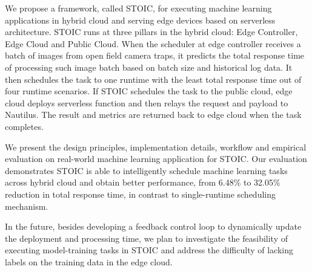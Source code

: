 We propose a framework, called STOIC, for executing machine learning applications in hybrid cloud and serving edge devices based on serverless architecture. STOIC runs at three pillars in the hybrid cloud: Edge Controller, Edge Cloud and Public Cloud. When the scheduler at edge controller receives a batch of images from open field camera traps, it predicts the total response time of processing such image batch based on batch size and historical log data. It then schedules the task to one runtime with the least total response time out of four runtime scenarios. If STOIC schedules the task to the public cloud, edge cloud deploys serverless function and then relays the request and payload to Nautilus. The result and metrics are returned back to edge cloud when the task completes.

We present the design principles, implementation details, workflow and empirical evaluation on real-world machine learning application for STOIC. Our evaluation demonstrates STOIC is able to intelligently schedule machine learning tasks across hybrid cloud and obtain better performance, from 6.48\% to 32.05\% reduction in total response time, in contrast to single-runtime scheduling mechanism.

In the future, besides developing a feedback control loop to dynamically update the deployment and processing time, we plan to investigate the feasibility of executing model-training tasks in STOIC and address the difficulty of lacking labels on the training data in the edge cloud.
